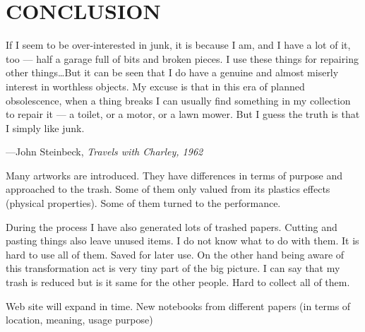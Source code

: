 \chapter{CONCLUSION}




\begin{singlespace}
\epigraph{If I seem to be over-interested in junk, it is because I am, and I have a lot of it, too --- half a garage full of bits and broken pieces. I use these things for repairing other things\ldots But it can be seen that I do have a genuine and almost miserly interest in worthless objects. My excuse is that in this era of planned obsolescence, when a thing breaks I can usually find something in my collection to repair it --- a toilet, or a motor, or a lawn mower. But I guess the truth is that I simply like junk.}{\hfill---John Steinbeck, \textit{Travels with Charley, 1962}}
\end{singlespace}




%
%
Many artworks are introduced. They have differences in terms of purpose and approached to the trash. Some of them only valued from its plastics effects (physical properties). Some of them turned to the performance. 







%
%
 During the process I have also generated lots of trashed papers. Cutting and pasting things also leave unused items. I do not know what to do with them. It is hard to use all of them. Saved for later use. On the other hand being aware of this transformation act is very tiny part of the big picture. I can say that my trash is reduced but is it same for the other people. Hard to collect all of them. 







%
%
 Web site will expand in time. New notebooks from different papers (in terms of location, meaning, usage purpose)


